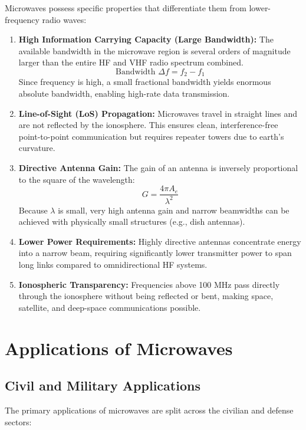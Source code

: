\documentclass[12pt,a4paper]{article}
\begin{document}
Microwaves possess specific properties that differentiate them from lower-frequency radio waves:

\begin{enumerate}[label=\textbf{\arabic*.}, leftmargin=*, itemsep=4pt]
  \item \textbf{High Information Carrying Capacity (Large Bandwidth):} The available bandwidth in the microwave region is several orders of magnitude larger than the entire HF and VHF radio spectrum combined.
    \begin{equation}
      \text{Bandwidth } \Delta f = f_2 - f_1
    \end{equation}
    Since frequency is high, a small fractional bandwidth yields enormous absolute bandwidth, enabling high-rate data transmission.
  \item \textbf{Line-of-Sight (LoS) Propagation:} Microwaves travel in straight lines and are not reflected by the ionosphere. This ensures clean, interference-free point-to-point communication but requires repeater towers due to earth's curvature.
  \item \textbf{Directive Antenna Gain:} The gain of an antenna is inversely proportional to the square of the wavelength:
    \begin{equation}
      G = \frac{4\pi A_e}{\lambda^2}
    \end{equation}
    Because $\lambda$ is small, very high antenna gain and narrow beamwidths can be achieved with physically small structures (e.g., dish antennas).
  \item \textbf{Lower Power Requirements:} Highly directive antennas concentrate energy into a narrow beam, requiring significantly lower transmitter power to span long links compared to omnidirectional HF systems.
  \item \textbf{Ionospheric Transparency:} Frequencies above 100 MHz pass directly through the ionosphere without being reflected or bent, making space, satellite, and deep-space communications possible.
\end{enumerate}

\section{Applications of Microwaves}

\subsection{Civil and Military Applications}
The primary applications of microwaves are split across the civilian and defense sectors:
\end{document}

